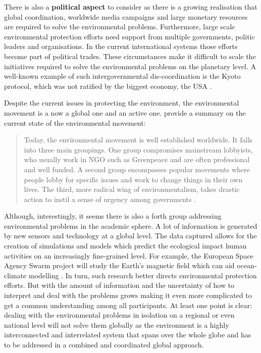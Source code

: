 There is also a \textbf{political aspect} to consider as there is a growing realisation that global coordination, worldwide media campaigns and large monetary resources are required to solve the environmental problems. Furthermore, large scale environmental protection efforts need support from multiple governments, politic leaders and organisations. In the current international systems those efforts become part of political trades. These circumstances make it difficult to scale the initiatives required to solve the environmental problems on the planetary level. A well-known example of such intergovernmental dis-coordination is the Kyoto protocol, which was not ratified by the biggest economy, the USA \citep{KyotoUS}.\par\vspace{0.2cm}

Despite the current issues in protecting the environment, the environmental movement is a now a global one and an active one. \citet{Plummer11} provide a summary on the current state of the environmental movement:\begin{quote}Today, the environmental movement is well established worldwide. It falls into three main groupings. One group compromises mainstream lobbyists, who usually work in NGO such as Greenpeace and are often professional and well funded. A second group encompasses popular movements where people lobby for specific issues and work to change things in their own lives. The third, more radical wing of environmentalism, takes drastic action to instil a sense of urgency among governments \citep[pg. 889]{Plummer11}.\end{quote}Although, interestingly, it seems there is also a forth group addressing environmental problems in the academic sphere. A lot of information is generated by new sensors and technology at a global level. The data captured allows for the creation of simulations and models which predict the ecological impact human activities on an increasingly fine-grained level. For example, the European Space Agency Swarm project will study the Earth's magnetic field which can aid ocean-climate modelling \citep[p. 354]{friis2006swarm}. In turn, such research better directs environmental protection efforts. But with the amount of information and the uncertainty of how to interpret and deal with the problems grows making it even more complicated to get a common understanding among all participants. At least one point is clear: dealing with the environmental problems in isolation on a regional or even national level will not solve them globally as the environment is a highly interconnected and interrelated system that spans over the whole globe and has to be addressed in a combined and coordinated global approach.

